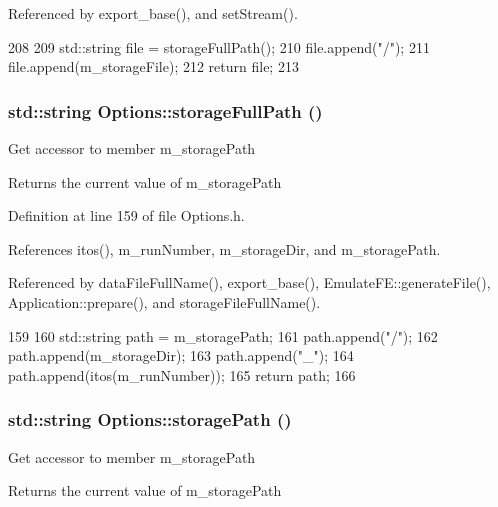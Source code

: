 Referenced by export\_\-base(), and setStream().


\begin{DoxyCode}
208                                         {
209                 std::string file = storageFullPath();
210                 file.append("/");
211                 file.append(m_storageFile);
212                 return file;
213         }
\end{DoxyCode}
\hypertarget{classOptions_aa5fe6b85088f3012226869480790a383}{
\subsubsection[{storageFullPath}]{\setlength{\rightskip}{0pt plus 5cm}std::string Options::storageFullPath ()}}
\label{classOptions_aa5fe6b85088f3012226869480790a383}
Get accessor to member m\_\-storagePath \begin{DoxyReturn}{Returns}
the current value of m\_\-storagePath 
\end{DoxyReturn}


Definition at line 159 of file Options.h.

References itos(), m\_\-runNumber, m\_\-storageDir, and m\_\-storagePath.

Referenced by dataFileFullName(), export\_\-base(), EmulateFE::generateFile(), Application::prepare(), and storageFileFullName().


\begin{DoxyCode}
159                                      {
160                 std::string path = m_storagePath;
161                 path.append("/");
162                 path.append(m_storageDir);
163                 path.append("_");
164                 path.append(itos(m_runNumber));
165                 return path;
166         }
\end{DoxyCode}
\hypertarget{classOptions_a3992b9247441a3e60e55c8c5fe32b394}{
\subsubsection[{storagePath}]{\setlength{\rightskip}{0pt plus 5cm}std::string Options::storagePath ()}}
\label{classOptions_a3992b9247441a3e60e55c8c5fe32b394}
Get accessor to member m\_\-storagePath \begin{DoxyReturn}{Returns}
the current value of m\_\-storagePath 
\end{DoxyReturn}


